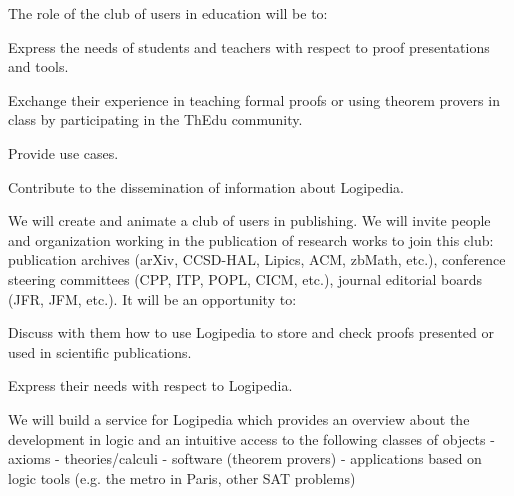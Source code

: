 \begin{workpackage}[id=dissemination,type=MGT,
  short={Dissemination},
  title={Dissemination, communication and exploitation},
  lead=Inr,InrRM=12,BirRM=4,IrtRM=4,ImtRM=2,StrRM=2,ZibRM=14,EduRM=12]
\begin{tasklist}
\begin{task}[id=teachers-club,
      title=Expanding the use of Logipedia in education,
      lead=Str,StrRM=2,wphases=7-42!.05]
    The role of the club of users in education will be to:
    \begin{compactitem}
    \item Express the needs of students and teachers with respect to proof
      presentations and tools.
    \item Exchange their experience in teaching formal proofs or using
      theorem provers in class by participating in the ThEdu community.
    \item Provide use cases.
    \item Contribute to the dissemination of information about Logipedia.
    \end{compactitem}

  \end{task}

  \begin{task}[id=publishers-club,
      title=Expanding the use of Logipedia in publishing,
      lead=Zib,ZibRM=2,wphases=7-42!.05]
    We will create and animate a club of users in publishing. We will invite
    people and organization working in the publication of research
    works to join this club: publication archives (arXiv, CCSD-HAL,
    Lipics, ACM, zbMath, etc.), conference steering committees (CPP,
    ITP, POPL, CICM, etc.), journal editorial boards (JFR, JFM,
    etc.). It will be an opportunity to:
    \begin{compactitem}
    \item Discuss with them how to use Logipedia to store and check
      proofs presented or used in scientific publications.
    \item Express their needs with respect to Logipedia.
    \end{compactitem}
  \end{task}

  \begin{task}[id=zib,
      title=Linking scientific publications to Logipedia,
      lead=Zib,ZibRM=12,wphases=12-23]
    We will build a service for Logipedia which provides an overview
    about the development in logic and an intuitive access to the
    following classes of objects - axioms - theories/calculi -
    software (theorem provers) - applications based on logic tools
    (e.g. the metro in Paris, other SAT problems)


\end{task}
\end{tasklist}
\end{workpackage}
